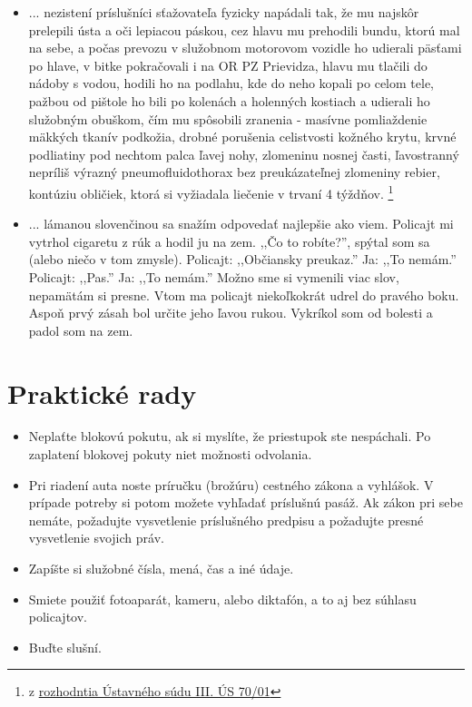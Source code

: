 \documentclass[openany]{book}
\begin{document}
\begin{itemize}
\item ... nezistení príslušníci sťažovateľa fyzicky napádali tak, že mu najskôr prelepili ústa a oči lepiacou páskou, cez hlavu mu prehodili bundu, ktorú mal na sebe, a počas prevozu v služobnom motorovom vozidle ho udierali päsťami po hlave, v bitke pokračovali i na OR PZ Prievidza, hlavu mu tlačili do nádoby s vodou, hodili ho na podlahu, kde do neho kopali po celom tele, pažbou od pištole ho bili po kolenách a holenných kostiach a udierali ho služobným obuškom, čím mu spôsobili zranenia - masívne pomliaždenie mäkkých tkanív podkožia, drobné porušenia celistvosti kožného krytu, krvné podliatiny pod nechtom palca ľavej nohy, zlomeninu nosnej časti, ľavostranný nepríliš výrazný pneumofluidothorax bez preukázateľnej zlomeniny rebier, kontúziu obličiek, ktorá si vyžiadala liečenie v trvaní 4 týždňov.  \footnote{z \href{http://www.concourt.sk/rozhod.do?urlpage=dokument&id_spisu=14061}{rozhodntia Ústavného súdu III. ÚS 70/01}}
\item 	 ... lámanou slovenčinou sa snažím odpovedať najlepšie ako viem. Policajt mi vytrhol cigaretu z rúk a hodil ju na zem. ,,Čo to robíte?'', spýtal som sa (alebo niečo v tom zmysle). Policajt: ,,Občiansky preukaz.''
	Ja: ,,To nemám.''
	Policajt: ,,Pas.''
	Ja: ,,To nemám.''
	Možno sme si vymenili viac slov, nepamätám si presne. Vtom ma policajt niekoľkokrát udrel do pravého boku. Aspoň prvý zásah bol určite jeho ľavou rukou. Vykríkol som od bolesti a padol som na zem.\cite{gogulski}
\end{itemize}


\chapter{Praktické rady}

\begin{itemize}
\item Neplaťte blokovú pokutu, ak si myslíte, že priestupok ste nespáchali. Po zaplatení blokovej pokuty niet možnosti odvolania.
\item Pri riadení auta noste príručku (brožúru) cestného zákona a vyhlášok. V prípade potreby si potom možete vyhľadať príslušnú pasáž. Ak zákon pri sebe nemáte, požadujte vysvetlenie príslušného predpisu a požadujte presné vysvetlenie svojich práv. 
\item Zapíšte si služobné čísla, mená, čas a iné údaje.
\item Smiete použiť fotoaparát, kameru, alebo diktafón, a to aj bez súhlasu policajtov.
\item Buďte slušní.
\end{itemize}
\end{document}
